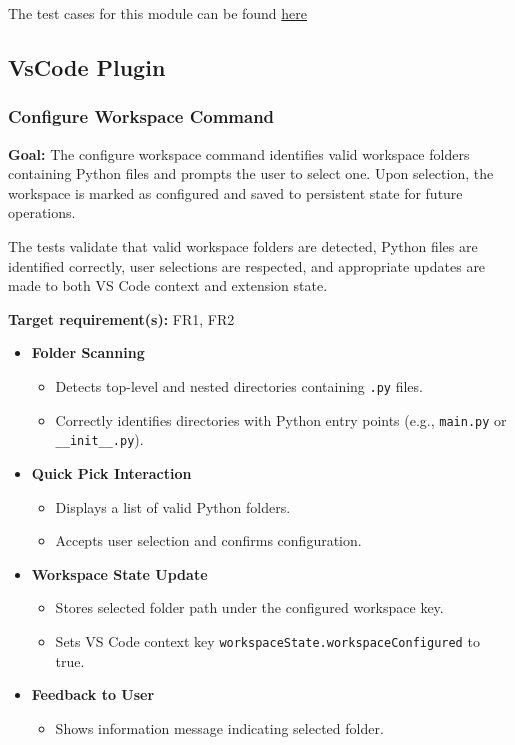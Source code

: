 \documentclass[12pt, titlepage]{article}
\begin{document}
  \noindent The test cases for this module can be found
  \href{https://github.com/ssm-lab/capstone--source-code-optimizer/blob/main/tests/refactorers/test_long_lambda_element_refactoring.py}{here}

\subsection{VsCode Plugin}

\subsubsection{Configure Workspace Command}

\textbf{Goal:} The configure workspace command identifies valid workspace folders containing Python files and prompts the user to select one. Upon selection, the workspace is marked as configured and saved to persistent state for future operations.

\medskip

\noindent The tests validate that valid workspace folders are detected, Python files are identified correctly, user selections are respected, and appropriate updates are made to both VS Code context and extension state.

\medskip

\noindent\textbf{Target requirement(s):} FR1, FR2~\cite{SRS}

\begin{itemize}
  \item \textbf{Folder Scanning}
    \begin{itemize}
      \item Detects top-level and nested directories containing \texttt{.py} files.
      \item Correctly identifies directories with Python entry points (e.g., \texttt{main.py} or \texttt{\_\_init\_\_.py}).
    \end{itemize}

  \item \textbf{Quick Pick Interaction}
    \begin{itemize}
      \item Displays a list of valid Python folders.
      \item Accepts user selection and confirms configuration.
    \end{itemize}

  \item \textbf{Workspace State Update}
    \begin{itemize}
      \item Stores selected folder path under the configured workspace key.
      \item Sets VS Code context key \texttt{workspaceState.workspaceConfigured} to true.
    \end{itemize}

  \item \textbf{Feedback to User}
    \begin{itemize}
      \item Shows information message indicating selected folder.
    \end{itemize}
\end{itemize}
\end{document}
